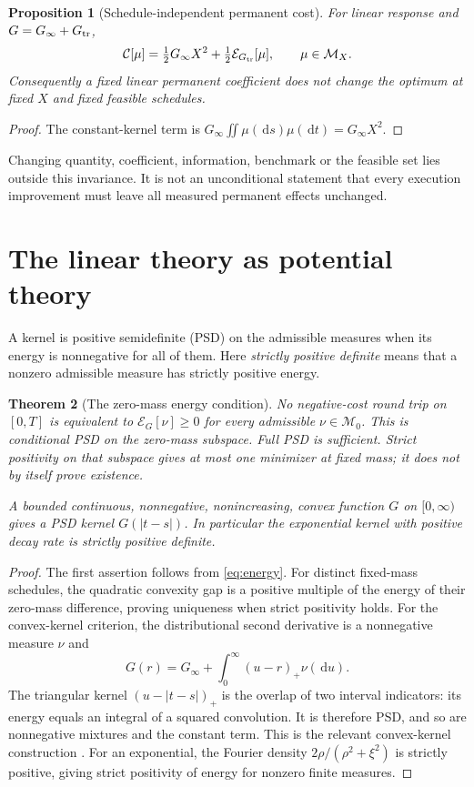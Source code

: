 \documentclass[11pt]{article}
\numberwithin{equation}{section}
\newtheorem{theorem}{Theorem}[section]
\newtheorem{proposition}[theorem]{Proposition}
\theoremstyle{definition}
\theoremstyle{remark}
\theoremstyle{definition}
\newcommand{\dd}{\,\mathrm d}
\begin{document}
\begin{proposition}[Schedule-independent permanent cost]\label{prop:perminvisible}
For linear response and $G=G_\infty+G_{\rm tr}$,
\[
 \mathcal C[\mu]=\tfrac12G_\infty X^2+
                    \tfrac12\mathcal E_{G_{\rm tr}}[\mu],\qquad \mu\in\mathcal M_X.
\]
Consequently a fixed linear permanent coefficient does not change the optimum
at fixed $X$ and fixed feasible schedules.
\end{proposition}
\begin{proof}
The constant-kernel term is
$G_\infty\iint\mu(\dd s)\mu(\dd t)=G_\infty X^2$.
\end{proof}
Changing quantity, coefficient, information, benchmark or the feasible set lies
outside this invariance. It is not an unconditional statement that every
execution improvement must leave all measured permanent effects unchanged.

\section{The linear theory as potential theory}\label{sec:linear}
A kernel is positive semidefinite (PSD) on the admissible measures when its energy
is nonnegative for all of them. Here \emph{strictly positive definite} means that
a nonzero admissible measure has strictly positive energy.

\begin{theorem}[The zero-mass energy condition]\label{thm:psd}
No negative-cost round trip on $[0,T]$ is equivalent to
$\mathcal E_G[\nu]\geq0$ for every admissible $\nu\in\mathcal M_0$.
This is conditional PSD on the zero-mass subspace. Full PSD is sufficient.
Strict positivity on that subspace gives at most one minimizer at fixed mass;
it does not by itself prove existence.

A bounded continuous, nonnegative, nonincreasing, convex function $G$ on
$[0,\infty)$ gives a PSD kernel $G(|t-s|)$. In particular the exponential
kernel with positive decay rate is strictly positive definite.
\end{theorem}
\begin{proof}
The first assertion follows from \eqref{eq:energy}. For distinct fixed-mass
schedules, the quadratic convexity gap is a positive multiple of the energy
of their zero-mass difference, proving uniqueness when strict positivity holds.
For the convex-kernel criterion, the distributional second derivative is a
nonnegative measure $\nu$ and
\[
 G(r)=G_\infty+\int_0^\infty(u-r)_+\nu(\dd u).
\]
The triangular kernel $(u-|t-s|)_+$ is the overlap of two interval indicators:
its energy equals an integral of a squared convolution. It is therefore PSD,
and so are nonnegative mixtures and the constant term. This is the relevant
convex-kernel construction \citep{alfonsischiedslynko2012}.
For an exponential, the Fourier density
$2\rho/(\rho^2+\xi^2)$ is strictly positive, giving strict positivity of energy
for nonzero finite measures.
\end{proof}
\end{document}
